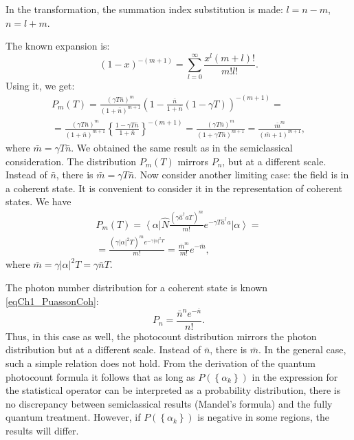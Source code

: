 In the transformation, the summation index substitution is made: $l = n - m$,
$n = l + m$.

The known expansion \cite{bDvait1973} is:
\[
\left(1 - x\right)^{-\left(m + 1\right)} = 
\sum_{l = 0}^\infty
\frac{x^l \left(m + l\right)!}{m! l!}.
\]
Using it, we get:
\begin{eqnarray}
P_m\left(T\right) = 
\frac{\left(\gamma T \bar{n}\right)^m}{\left(1 + \bar{n}\right)^{m +
    1}}
\left(
1 - \frac{\bar{n}}{1 + \bar{n}}\left(1 - \gamma T\right)
\right)^{-\left(m + 1\right)} = 
\nonumber \\
=
\frac{\left(\gamma T \bar{n}\right)^m}{\left(1 + \bar{n}\right)^{m +
    1}} 
\left\{
\frac{1 - \gamma T \bar{n}}{1 + \bar{n}} 
\right\}^{-\left(m + 1\right)} = 
\frac{\left(\gamma T \bar{n}\right)^m}{\left(1 + \gamma T \bar{n}\right)^{m +
    1}} =
\frac{\bar{m}^m}{\left(\bar{m} + 1\right)^{m + 1}},
\label{eqCh4_66}
\end{eqnarray}
where $\bar{m} = \gamma T \bar{n}$.  We obtained the same result as
in the semiclassical 
consideration. The distribution $P_m\left(T\right)$ mirrors $P_n$, but at a different 
scale. Instead of $\bar{n}$, there is $\bar{m} = \gamma T \bar{n}$. Now consider another limiting case: the field is in a
coherent state. It is convenient to consider it in the representation
of coherent states. We have  
\begin{eqnarray}
P_m\left(T\right) = 
\left<\alpha\right|
\hat{N}
\frac{\left(\gamma \hat{a}^{\dag} \hat{a} T\right)^m}{m!}
e^{- \gamma T \hat{a}^{\dag} \hat{a}}
\left|\alpha\right> = 
\nonumber \\
=
\frac{\left(\gamma \left|\alpha\right|^2 T\right)^m e^{-\gamma
    \left|\alpha\right|^2 T}}{m!} = 
\frac{\bar{m}^m}{m!}e^{-\bar{m}},
\label{eqCh4_67}
\end{eqnarray}
where $\bar{m} = \gamma \left|\alpha\right|^2 T = \gamma \bar{n} T$.

The photon number distribution for a coherent state is known
\eqref{eqCh1_PuassonCoh}:
\[
P_n = \frac{\bar{n}^n e^{-\bar{n}}}{n!}.
\]
Thus, in this case as well, the photocount distribution
mirrors the photon distribution but at a different scale. Instead of
$\bar{n}$, there is $\bar{m}$.  In the general case, such a simple relation does not hold. From the derivation of the quantum photocount formula
it follows that as long as $P\left(\left\{\alpha_k\right\}\right)$ in the expression 
for the statistical operator can be interpreted as a probability distribution, there is no discrepancy between semiclassical results
(Mandel's formula) and the fully quantum treatment. However, if
$P\left(\left\{\alpha_k\right\}\right)$ is negative in some regions, the results will differ.  
